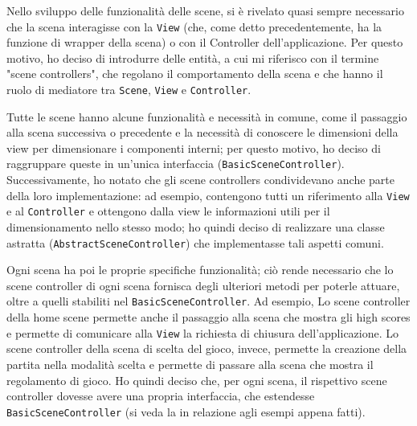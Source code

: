 \documentclass[a4paper,12pt]{report}
\begin{document}
Nello sviluppo delle funzionalità delle scene, si è rivelato quasi sempre necessario che la scena interagisse con la \texttt{View} (che, come detto precedentemente, ha la funzione di wrapper della scena) o con il Controller dell'applicazione. Per questo motivo, ho deciso di introdurre delle entità, a cui mi riferisco con il termine "scene controllers", che regolano il comportamento della scena e che hanno il ruolo di mediatore tra \texttt{Scene}, \texttt{View} e \texttt{Controller}.

Tutte le scene hanno alcune funzionalità e necessità in comune, come il passaggio alla scena successiva o precedente e la necessità di conoscere le dimensioni della view per dimensionare i componenti interni; per questo motivo, ho deciso di raggruppare queste in un'unica interfaccia (\texttt{BasicSceneController}). Successivamente, ho notato che gli scene controllers condividevano anche parte della loro implementazione: ad esempio, contengono tutti un riferimento alla \texttt{View} e al \texttt{Controller} e ottengono dalla view le informazioni utili per il dimensionamento nello stesso modo; ho quindi deciso di realizzare una classe astratta (\texttt{AbstractSceneController}) che implementasse tali aspetti comuni.

Ogni scena ha poi le proprie specifiche funzionalità; ciò rende necessario che lo scene controller di ogni scena fornisca degli ulteriori metodi per poterle attuare, oltre a quelli stabiliti nel \texttt{BasicSceneController}. Ad esempio, Lo scene controller della home scene permette anche il passaggio alla scena che mostra gli high scores e permette di comunicare alla \texttt{View} la richiesta di chiusura dell'applicazione. Lo scene controller della scena di scelta del gioco, invece, permette la creazione della partita nella modalità scelta e permette di passare alla scena che mostra il regolamento di gioco. Ho quindi deciso che, per ogni scena, il rispettivo scene controller dovesse avere una propria interfaccia, che estendesse \texttt{BasicSceneController} (si veda la  in relazione agli esempi appena fatti). 
\end{document}

